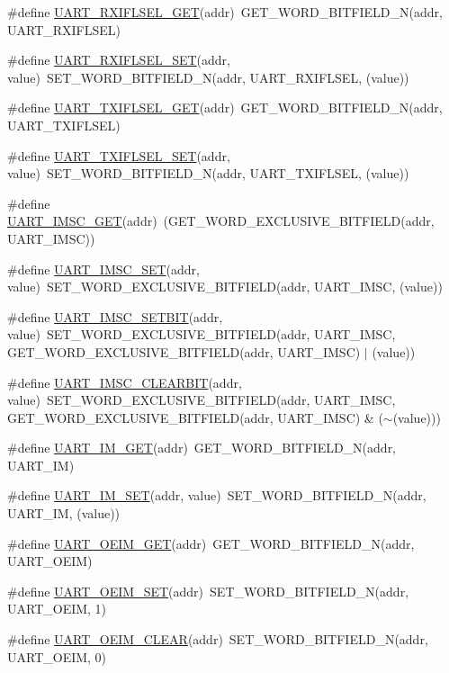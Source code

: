 \begin{DoxyCompactItemize}
\item 
\#define \hyperlink{a00574_a8bbb55671dd08e8fa41ad421fef06566}{UART\_\-RXIFLSEL\_\-GET}(addr)~GET\_\-WORD\_\-BITFIELD\_\-N(addr, UART\_\-RXIFLSEL)
\item 
\#define \hyperlink{a00574_a78f4b7284b1b663f5bdbaa5ee42da1f9}{UART\_\-RXIFLSEL\_\-SET}(addr, value)~SET\_\-WORD\_\-BITFIELD\_\-N(addr, UART\_\-RXIFLSEL, (value))
\item 
\#define \hyperlink{a00574_ae64e7038eae2a9d5521b413a7bef6067}{UART\_\-TXIFLSEL\_\-GET}(addr)~GET\_\-WORD\_\-BITFIELD\_\-N(addr, UART\_\-TXIFLSEL)
\item 
\#define \hyperlink{a00574_a7fd002c965d993ab2d20a6458b229419}{UART\_\-TXIFLSEL\_\-SET}(addr, value)~SET\_\-WORD\_\-BITFIELD\_\-N(addr, UART\_\-TXIFLSEL, (value))
\item 
\#define \hyperlink{a00574_a71e8a3267dad46da30ce2dc07f6f2d5f}{UART\_\-IMSC\_\-GET}(addr)~(GET\_\-WORD\_\-EXCLUSIVE\_\-BITFIELD(addr, UART\_\-IMSC))
\item 
\#define \hyperlink{a00574_ab489702c7cbb5ee411f36479edb49206}{UART\_\-IMSC\_\-SET}(addr, value)~SET\_\-WORD\_\-EXCLUSIVE\_\-BITFIELD(addr, UART\_\-IMSC, (value))
\item 
\#define \hyperlink{a00574_a73ea305b3734ac284769169a2af8a2de}{UART\_\-IMSC\_\-SETBIT}(addr, value)~SET\_\-WORD\_\-EXCLUSIVE\_\-BITFIELD(addr, UART\_\-IMSC, GET\_\-WORD\_\-EXCLUSIVE\_\-BITFIELD(addr, UART\_\-IMSC) $|$ (value))
\item 
\#define \hyperlink{a00574_a13022875024a6a3dd73b1ca624a29e1f}{UART\_\-IMSC\_\-CLEARBIT}(addr, value)~SET\_\-WORD\_\-EXCLUSIVE\_\-BITFIELD(addr, UART\_\-IMSC, GET\_\-WORD\_\-EXCLUSIVE\_\-BITFIELD(addr, UART\_\-IMSC) \& ($\sim$(value)))
\item 
\#define \hyperlink{a00574_a3be979ad6767513240b26887f6a67cd3}{UART\_\-IM\_\-GET}(addr)~GET\_\-WORD\_\-BITFIELD\_\-N(addr, UART\_\-IM)
\item 
\#define \hyperlink{a00574_a52abd86bd49f6d4e2fd58559e332a26b}{UART\_\-IM\_\-SET}(addr, value)~SET\_\-WORD\_\-BITFIELD\_\-N(addr, UART\_\-IM, (value))
\item 
\#define \hyperlink{a00574_a18620c7110898a589701aee276e0fa91}{UART\_\-OEIM\_\-GET}(addr)~GET\_\-WORD\_\-BITFIELD\_\-N(addr, UART\_\-OEIM)
\item 
\#define \hyperlink{a00574_a677cd40be31faba1ef6bacbbd9fbe1c0}{UART\_\-OEIM\_\-SET}(addr)~SET\_\-WORD\_\-BITFIELD\_\-N(addr, UART\_\-OEIM, 1)
\item 
\#define \hyperlink{a00574_ae8c8c1306290e03b74ace24480f25e29}{UART\_\-OEIM\_\-CLEAR}(addr)~SET\_\-WORD\_\-BITFIELD\_\-N(addr, UART\_\-OEIM, 0)

\end{DoxyCompactItemize}
